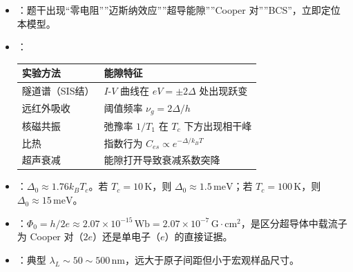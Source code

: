 \begin{tipbox}[快速识别与解题技巧]
\begin{itemize}
    \item {}：题干出现``零电阻''''迈斯纳效应''''超导能隙''''Cooper 对''''BCS''，立即定位本模型。
    \item {}：
    \begin{center}
    \begin{tabular}{ll}
    \toprule
    \textbf{实验方法} & \textbf{能隙特征} \\
    \midrule
    隧道谱（SIS结） & $I$-$V$ 曲线在 $eV=\pm2\Delta$ 处出现跃变 \\
    远红外吸收 & 阈值频率 $\nu_g=2\Delta/h$ \\
    核磁共振 & 弛豫率 $1/T_1$ 在 $T_c$ 下方出现相干峰 \\
    比热 & 指数行为 $C_{es}\propto e^{-\Delta/k_BT}$ \\
    超声衰减 & 能隙打开导致衰减系数突降 \\
    \bottomrule
    \end{tabular}
    \end{center}
    \item {}：$\Delta_0\approx1.76k_BT_c$。若 $T_c=10\,\text{K}$，则 $\Delta_0\approx1.5\,\text{meV}$；若 $T_c=100\,\text{K}$，则 $\Delta_0\approx15\,\text{meV}$。
    \item {}：$\Phi_0=h/2e\approx2.07\times10^{-15}\,\text{Wb}=2.07\times10^{-7}\,\text{G}\cdot\text{cm}^2$，是区分超导体中载流子为 Cooper 对（$2e$）还是单电子（$e$）的直接证据。
    \item {}：典型 $\lambda_L\sim50\sim500\,\text{nm}$，远大于原子间距但小于宏观样品尺寸。
\end{itemize}
\end{tipbox}

